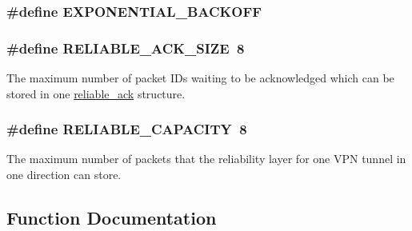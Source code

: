 \subsubsection[{E\+X\+P\+O\+N\+E\+N\+T\+I\+A\+L\+\_\+\+B\+A\+C\+K\+O\+F\+F}]{\setlength{\rightskip}{0pt plus 5cm}\#define E\+X\+P\+O\+N\+E\+N\+T\+I\+A\+L\+\_\+\+B\+A\+C\+K\+O\+F\+F}\label{group__reliable_gacb891f0bfc023839a53a2c7005cd340c}
\hypertarget{group__reliable_ga91ccbc389e490d03321b1a6de0dd096d}{}
\subsubsection[{R\+E\+L\+I\+A\+B\+L\+E\+\_\+\+A\+C\+K\+\_\+\+S\+I\+Z\+E}]{\setlength{\rightskip}{0pt plus 5cm}\#define R\+E\+L\+I\+A\+B\+L\+E\+\_\+\+A\+C\+K\+\_\+\+S\+I\+Z\+E~8}\label{group__reliable_ga91ccbc389e490d03321b1a6de0dd096d}
The maximum number of packet I\+Ds waiting to be acknowledged which can be stored in one {\ttfamily \hyperlink{structreliable__ack}{reliable\+\_\+ack}} structure. \hypertarget{group__reliable_gaa626a13dc31bf131a92548b9b2810cba}{}
\subsubsection[{R\+E\+L\+I\+A\+B\+L\+E\+\_\+\+C\+A\+P\+A\+C\+I\+T\+Y}]{\setlength{\rightskip}{0pt plus 5cm}\#define R\+E\+L\+I\+A\+B\+L\+E\+\_\+\+C\+A\+P\+A\+C\+I\+T\+Y~8}\label{group__reliable_gaa626a13dc31bf131a92548b9b2810cba}
The maximum number of packets that the reliability layer for one V\+P\+N tunnel in one direction can store. 

\subsection{Function Documentation}
\hypertarget{group__reliable_ga3bdc89dd24741d52a2fcf8182389b947}{}
